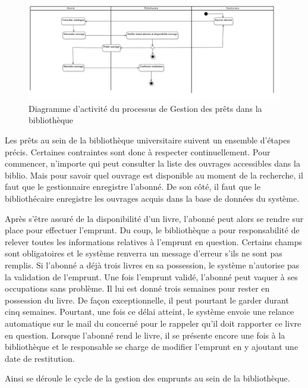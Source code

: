 \paragraph{}
\begin{figure}[h]
        \centering
        \includegraphics[width=1\textwidth]{ActivityDiagram1}
        \caption{Diagramme d’activité du processus de Gestion des prêts dans la bibliothèque}
        \label{image-ActivityDiagram1}
        \end{figure}
\par
Les prêts au sein de la bibliothèque universitaire suivent un ensemble d'étapes précis.
Certaines contraintes sont donc à respecter continuellement. Pour commencer, n'importe qui 
peut consulter la liste des ouvrages accessibles dans la biblio. Mais pour savoir quel 
ouvrage est disponible au moment de la recherche, il faut que le gestionnaire enregistre 
l'abonné. De son côté, il faut que le bibliothécaire enregistre les ouvrages acquis 
dans la base de données du système. \par 
Après s'être assuré de la disponibilité d'un livre, l'abonné peut alors se rendre sur 
place pour effectuer l'emprunt. Du coup, le bibliothèque a pour responsabilité de relever
toutes les informations relatives à l'emprunt en question. Certains champs sont obligatoires
et le système renverra un message d'erreur s'ils ne sont pas remplis. Si l'abonné a déjà 
trois livres en sa possession, le système n'autorise pas la validation de l'emprunt.
Une fois l'emprunt validé, l'abonné peut vaquer à ses occupations sans problème. Il lui 
est donné trois semaines pour rester en possession du livre. De façon exceptionnelle, il 
peut pourtant le garder durant cinq semaines. Pourtant, une fois ce délai atteint, le 
système envoie une relance automatique sur le mail du concerné pour le rappeler qu'il doit 
rapporter ce livre en question.
Lorsque l'abonné rend le livre, il se présente encore une fois à la bibliothèque et le 
responsable se charge de modifier l'emprunt en y ajoutant une date de restitution. \par 
Ainsi se déroule le cycle de la gestion des emprunts au sein de la bibliothèque.
